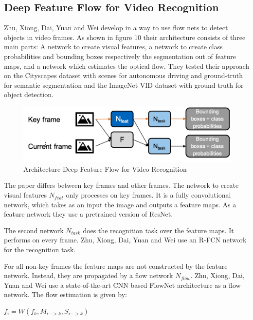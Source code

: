 \documentclass[conference]{IEEEtran}
\begin{document}
\subsection{Deep Feature Flow for Video Recognition \cite{2}}
Zhu, Xiong, Dai, Yuan and Wei develop in \cite{b2} a way to use flow nets to detect objects in video frames. As shown in figure 10 their architecture consists of three main parts: A network to create visual features, a network to create class probabilities and bounding boxes respectively the segmentation out of feature maps, and a network which estimates the optical flow. They tested their approach on the Cityscapes dataset with scenes for autonomous driving and ground-truth for semantic segmentation and the ImageNet VID dataset \cite{b35} with ground truth for object detection.

\begin{figure} [h]
\includegraphics[width=\columnwidth]{Flow}
\caption{Architecture Deep Feature Flow for Video Recognition}
\end{figure}

The paper differs between key frames and other frames. The network to create visual features $ N_{feat} $ only processes on key frames. It is a fully convolutional network, which takes as an input the image and outputs a feature maps. As a feature network they use a pretrained version of ResNet. \newline

The second network $ N_{task} $ does the recognition task over the feature maps. It performs on every frame.  Zhu, Xiong, Dai, Yuan and Wei use an R-FCN network for the recognition task.  \newline

For all non-key frames the feature maps are not constructed by the feature network. Instead, they are propagated by a flow network $ N_{flow} $.  Zhu, Xiong, Dai, Yuan and Wei use a state-of-the-art CNN based FlowNet architecture as a flow network. The flow estimation is given by: \newline

$ f_{i} =  W (f_{k},M_{i->k}, S_{i->k})$ \newline
\end{document}
